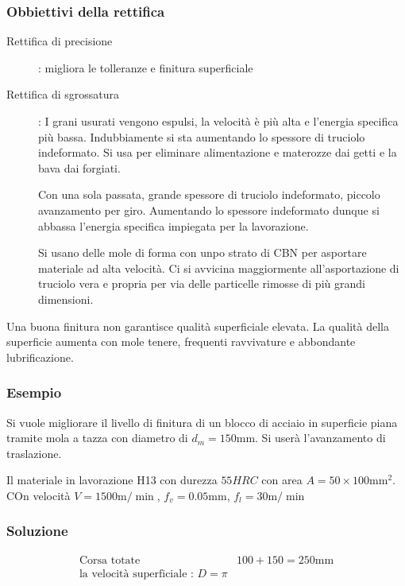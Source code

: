 \subsubsection{Obbiettivi della rettifica}
\begin{description}
\item[Rettifica di precisione]: migliora le tolleranze e finitura superficiale
\item[Rettifica di sgrossatura]: I grani usurati vengono espulsi, la velocità è più alta e l'energia specifica più bassa. Indubbiamente si sta aumentando lo spessore di truciolo indeformato.
Si usa per eliminare alimentazione e materozze dai getti e la bava dai forgiati.
\item[] Con una sola passata, grande spessore di truciolo indeformato, piccolo avanzamento per giro.
Aumentando lo spessore indeformato dunque si abbassa l'energia specifica impiegata per la lavorazione.
\item[] Si usano delle mole di forma con unpo strato di CBN per asportare materiale ad alta velocità. Ci si avvicina maggiormente all'asportazione di truciolo vera e propria per via delle particelle rimosse di più grandi dimensioni.
\end{description}

Una buona finitura non garantisce qualità superficiale elevata.
La qualità della superficie aumenta con mole tenere, frequenti ravvivature e abbondante lubrificazione.

\subsubsection*{Esempio}
Si vuole migliorare il livello di finitura di un blocco di acciaio in superficie piana tramite mola a tazza con diametro di $d_m = 150\unit{\mm}$. Si userà l'avanzamento di traslazione.

Il materiale in lavorazione H13 con durezza $55\unit{HRC}$
con area $A = 50 \times 100 \unit{\mm^2}$.
COn velocità $V = 1500\unit{\m/\min}$, $f_v = 0.05\unit{\mm}$, $f_l = 30\unit{\m/\min}$
\subsubsection*{Soluzione}
\begin{align*}
\text{Corsa totate} & 100 + 150 = 250\unit{\mm}\\
\text{la velocità superficiale : } D = \pi \\
\end{align*}

